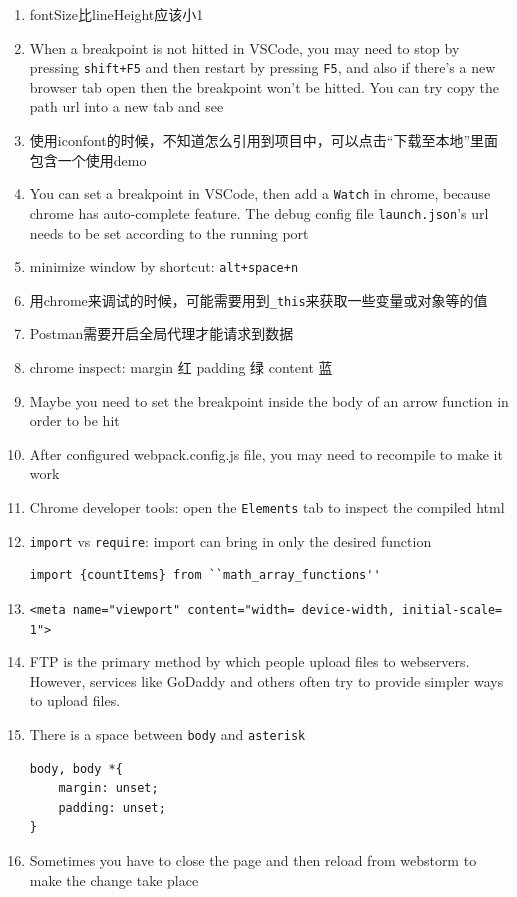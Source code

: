 \documentclass[a4paper, 12pt]{article}
\begin{document}
\begin{enumerate}
\item fontSize比lineHeight应该小1

\item When a breakpoint is not hitted in VSCode, you may need to stop by pressing \verb|shift+F5| and then restart by pressing \verb|F5|, and also if there's a new browser tab open then the breakpoint won't be hitted. You can try copy the path url into a new tab and see

\item 使用iconfont的时候，不知道怎么引用到项目中，可以点击“下载至本地”里面包含一个使用demo

\item You can set a breakpoint in VSCode, then add a \verb|Watch| in chrome, because chrome has auto-complete feature. The debug config file \verb|launch.json|'s url needs to be set according to the running port

\item minimize window by shortcut: \verb|alt+space+n|

\item 用chrome来调试的时候，可能需要用到\verb|_this|来获取一些变量或对象等的值

\item Postman需要开启全局代理才能请求到数据

\item chrome inspect: margin 红 \quad padding 绿 \quad content 蓝

\item Maybe you need to set the breakpoint inside the body of an arrow function in order to be hit

\item After configured webpack.config.js file, you may need to recompile to make it work

\item Chrome developer tools: open the \verb|Elements| tab to inspect the compiled html

\item \verb|import| vs \verb|require|: import can bring in only the desired function
\begin{verbatim}
import {countItems} from ``math_array_functions''
\end{verbatim}

\item \verb|<meta name="viewport" content="width= device-width, initial-scale= 1">|

\item  FTP is the primary method by which people upload files to webservers. However, services like GoDaddy and others often try to provide simpler ways to upload files.

\item There is a space between \verb|body| and \verb|asterisk|
\begin{verbatim}
body, body *{
    margin: unset;
    padding: unset;
}
\end{verbatim}

\item Sometimes you have to close the page and then reload from webstorm to make the change take place
\end{enumerate}
\end{document}
